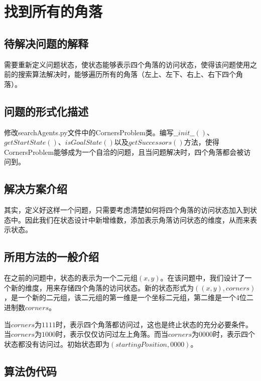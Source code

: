 \documentclass[forprint]{WHUBachelor}
\begin{document}
\section{找到所有的角落}

\subsection{待解决问题的解释}

需要重新定义问题状态，使状态能够表示四个角落的访问状态，使得该问题使用之前的搜索算法解决时，能够遍历所有的角落（左上、左下、右上、右下四个角落）。

\subsection{问题的形式化描述}

修改searchAgents.py文件中的CornersProblem类。编写$\_\_init\_\_()$、$getStartState()$、$isGoalState()$以及$getSuccessors()$方法，使得CornersProblem能够成为一个自洽的问题，且当问题解决时，四个角落都会被访问到。

\subsection{解决方案介绍}

其实，定义好这样一个问题，只需要考虑清楚如何将四个角落的访问状态加入到状态中。因此我们在状态设计中新增维数，添加表示角落访问状态的维度，从而来表示状态。

\subsection{所用方法的一般介绍}

在之前的问题中，状态的表示为一个二元组$(x,y)$。在该问题中，我们设计了一个新的维度，用来存储四个角落的访问状态。新的状态形式为$((x,y),corners)$，是一个新的二元组，该二元组的第一维是一个坐标二元组，第二维是一个4位二进制数$corners$。

当$corners$为$1111$时，表示四个角落都访问过，这也是终止状态的充分必要条件。当$corners$为$1000$时，表示仅仅访问过左上角落。而当$corners$为$0000$时，表示四个状态都没有访问过。初始状态即为$(startingPosition, 0000)$。

\subsection{算法伪代码}
\end{document}
